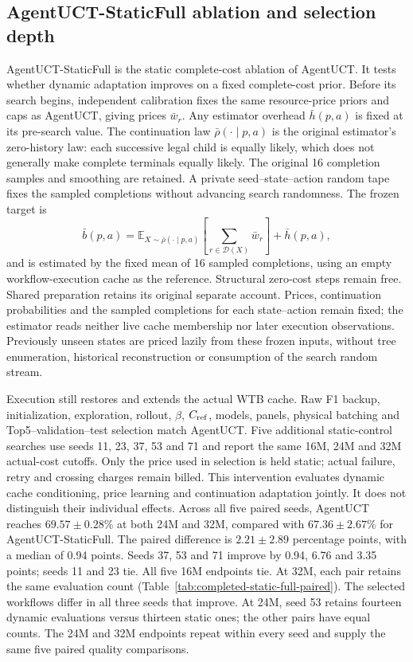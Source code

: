 \subsection{AgentUCT-StaticFull ablation and selection depth}
\label{sec:static-complete-design}
AgentUCT-StaticFull is the static complete-cost ablation of AgentUCT.
It tests whether dynamic adaptation improves on a fixed complete-cost prior. Before its search begins, independent calibration fixes
the same resource-price priors and caps as AgentUCT, giving prices $\bar w_r$.
Any estimator overhead $\bar h(p,a)$ is fixed at its pre-search value.
The continuation law
$\bar\rho(\cdot\mid p,a)$ is the original estimator's zero-history law:
each successive legal child is equally likely, which does not generally
make complete terminals equally likely. The original 16 completion samples
and smoothing are retained. A private seed--state--action random tape fixes
the sampled completions without advancing search randomness. The frozen target is
\[
 \bar b(p,a)=\mathbb E_{X\sim\bar\rho(\cdot\mid p,a)}
                 \left[\sum_{r\in\mathcal D(X)}\bar w_r\right]+\bar h(p,a),
\]
and is estimated by the fixed mean of 16 sampled completions, using an empty
workflow-execution cache as the reference. Structural
zero-cost steps remain free. Shared preparation retains its original separate
account. Prices, continuation probabilities and the sampled completions for
each state--action remain fixed; the estimator reads neither live cache
membership nor later execution observations. Previously unseen states are
priced lazily from these frozen inputs, without tree enumeration, historical
reconstruction or consumption of the search random stream.

Execution still restores and extends the actual WTB cache. Raw F1 backup,
initialization, exploration, rollout, $\beta$, $C_{\rm ref}$, models, panels,
physical batching and Top5--validation--test selection match AgentUCT. Five
additional static-control searches use seeds 11, 23, 37, 53 and 71 and report
the same 16M, 24M and 32M actual-cost cutoffs. Only the price used in selection
is held static; actual failure, retry and crossing charges remain billed.
This intervention evaluates dynamic cache conditioning, price learning and
continuation adaptation jointly. It does not distinguish their individual
effects. Across all five paired seeds, AgentUCT reaches $69.57\pm0.28\%$
at both 24M and 32M, compared with $67.36\pm2.67\%$ for AgentUCT-StaticFull.
The paired difference is $2.21\pm2.89$ percentage points, with a median of
0.94 points. Seeds 37, 53 and 71 improve by 0.94, 6.76 and 3.35 points;
seeds 11 and 23 tie. All five 16M endpoints tie. At 32M, each pair retains
the same evaluation count (Table~\ref{tab:completed-static-full-paired}).
The selected workflows differ in all three seeds that improve. At 24M,
seed 53 retains fourteen dynamic evaluations versus thirteen static ones;
the other pairs have equal counts. The 24M and 32M endpoints repeat within
every seed and supply the same five paired quality comparisons.

